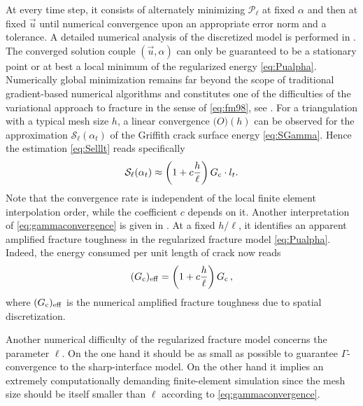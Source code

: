 At every time step, it consists of alternately minimizing $\mathcal{P}_\ell$ at fixed $\alpha$ and then at fixed $\vec{u}$ until numerical convergence upon an appropriate error norm and a tolerance. A detailed numerical analysis of the discretized model is performed in \cite{BourdinFrancfortMarigo:2008}. The converged solution couple $(\vec{u},\alpha)$ can only be guaranteed to be a stationary point or at best a local minimum of the regularized energy \eqref{eq:Pualpha}. Numerically global minimization remains far beyond the scope of traditional gradient-based numerical algorithms and constitutes one of the difficulties of the variational approach to fracture in the sense of \eqref{eq:fm98}, see \cite{BourdinFrancfortMarigo:2008}. For a triangulation with a typical mesh size $h$, a linear convergence $\mathcal(O)(h)$ can be observed for the approximation $\mathcal{S}_\ell(\alpha_t)$ of the Griffith crack surface energy \eqref{eq:SGamma}. Hence the estimation \eqref{eq:Selllt} reads specifically
\begin{equation} \label{eq:gammaconvergence}
\mathcal{S}_\ell(\alpha_t)\approx\left(1+c\frac{h}{\ell}\right)G_\mathrm{c}\cdot l_t.
\end{equation}
Note that the convergence rate is independent of the local finite element interpolation order, while the coefficient $c$ depends on it. Another interpretation of \eqref{eq:gammaconvergence} is given in \cite{BourdinFrancfortMarigo:2008}. At a fixed $h/\ell$, it identifies an apparent amplified fracture toughness in the regularized fracture model \eqref{eq:Pualpha}. Indeed, the energy consumed per unit length of crack now reads
\begin{equation} \label{eq:gceff}
(G_\mathrm{c})_\mathrm{eff}=\left(1+c\frac{h}{\ell}\right)G_\mathrm{c}\,,
\end{equation}
where $(G_\mathrm{c})_\mathrm{eff}$ is the numerical amplified fracture toughness due to spatial discretization.

Another numerical difficulty of the regularized fracture model concerns the parameter $\ell$. On the one hand it should be as small as possible to guarantee $\Gamma$-convergence to the sharp-interface model. On the other hand it implies an extremely computationally demanding finite-element simulation since the mesh size should be itself smaller than $\ell$ according to \eqref{eq:gammaconvergence}.

